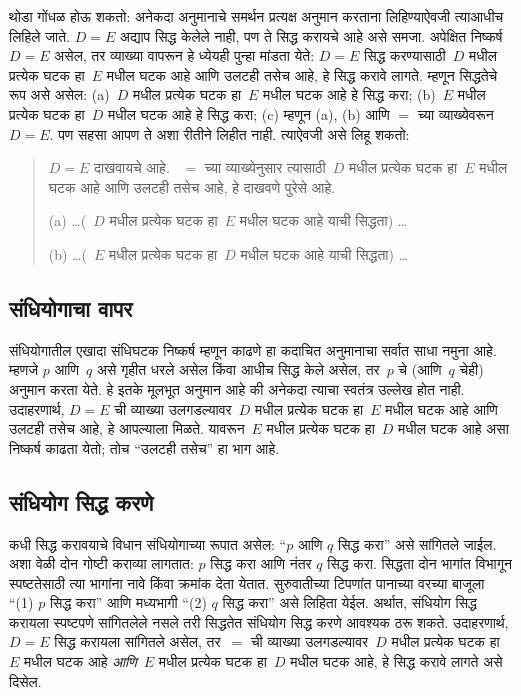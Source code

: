थोडा गोंधळ होऊ शकतो: अनेकदा अनुमानाचे समर्थन प्रत्यक्ष अनुमान करताना लिहिण्याऐवजी त्याआधीच लिहिले जाते. $D = E$ अद्याप सिद्ध केलेले नाही, पण ते सिद्ध करायचे आहे असे समजा. अपेक्षित निष्कर्ष $D = E$ असेल, तर व्याख्या वापरून हे ध्येयही पुन्हा मांडता येते: $D = E$ सिद्ध करण्यासाठी~$D$ मधील प्रत्येक घटक हा~$E$ मधील घटक आहे आणि उलटही तसेच आहे, हे सिद्ध करावे लागते. म्हणून सिद्धतेचे रूप असे असेल: (a)~$D$ मधील प्रत्येक घटक हा~$E$ मधील घटक आहे हे सिद्ध करा; (b)~$E$ मधील प्रत्येक घटक हा~$D$ मधील घटक आहे हे सिद्ध करा; (c) म्हणून (a), (b) आणि $=$ च्या व्याख्येवरून $D = E$. पण सहसा आपण ते अशा रीतीने लिहीत नाही. त्याऐवजी असे लिहू शकतो:
\begin{quote}
$D = E$ दाखवायचे आहे. ~$=$ च्या व्याख्येनुसार त्यासाठी~$D$ मधील प्रत्येक घटक हा~$E$ मधील घटक आहे आणि उलटही तसेच आहे, हे दाखवणे पुरेसे आहे.

(a) \dots (~$D$ मधील प्रत्येक घटक हा~$E$ मधील घटक आहे याची सिद्धता) \dots

(b) \dots (~$E$ मधील प्रत्येक घटक हा~$D$ मधील घटक आहे याची सिद्धता) \dots
\end{quote}

\subsection{संधियोगाचा वापर}

संधियोगातील एखादा संधिघटक निष्कर्ष म्हणून काढणे हा कदाचित अनुमानाचा सर्वात साधा नमुना आहे. म्हणजे $p$ आणि~$q$ असे गृहीत धरले असेल किंवा आधीच सिद्ध केले असेल, तर~$p$ चे (आणि~$q$ चेही) अनुमान करता येते. हे इतके मूलभूत अनुमान आहे की अनेकदा त्याचा स्वतंत्र उल्लेख होत नाही. उदाहरणार्थ, $D = E$ ची व्याख्या उलगडल्यावर~$D$ मधील प्रत्येक घटक हा~$E$ मधील घटक आहे आणि उलटही तसेच आहे, हे आपल्याला मिळते. यावरून~$E$ मधील प्रत्येक घटक हा~$D$ मधील घटक आहे असा निष्कर्ष काढता येतो; तोच “उलटही तसेच” हा भाग आहे.

\subsection{संधियोग सिद्ध करणे}

कधी सिद्ध करावयाचे विधान संधियोगाच्या रूपात असेल: “$p$ आणि $q$ सिद्ध करा” असे सांगितले जाईल. अशा वेळी दोन गोष्टी कराव्या लागतात: $p$ सिद्ध करा आणि नंतर $q$ सिद्ध करा. सिद्धता दोन भागांत विभागून स्पष्टतेसाठी त्या भागांना नावे किंवा क्रमांक देता येतात. सुरुवातीच्या टिपणांत पानाच्या वरच्या बाजूला “(1) $p$ सिद्ध करा” आणि मध्यभागी “(2) $q$ सिद्ध करा” असे लिहिता येईल. अर्थात, संधियोग सिद्ध करायला स्पष्टपणे सांगितलेले नसले तरी सिद्धतेत संधियोग सिद्ध करणे आवश्यक ठरू शकते. उदाहरणार्थ, $D = E$ सिद्ध करायला सांगितले असेल, तर~$=$ ची व्याख्या उलगडल्यावर~$D$ मधील प्रत्येक घटक हा~$E$ मधील घटक आहे \emph{आणि}~$E$ मधील प्रत्येक घटक हा~$D$ मधील घटक आहे, हे सिद्ध करावे लागते असे दिसेल.

